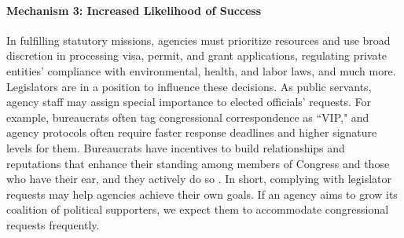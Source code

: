 \documentclass[12pt]{article}
\begin{document}
\paragraph{Mechanism 3: Increased Likelihood of Success} 

In fulfilling statutory missions, agencies must prioritize resources and use broad discretion in processing visa, permit, and grant applications, regulating private entities' compliance with environmental, health, and labor laws, and much more. 
Legislators are in a position to influence these decisions.
As public servants, agency staff may assign special importance to elected officials' requests. For example, bureaucrats often tag congressional correspondence as ``VIP," and agency protocols often require faster response deadlines and higher signature levels for them. %
Bureaucrats have incentives to build relationships and reputations that enhance their standing among members of Congress and those who have their ear, and they actively do so \citep{Carpenter2001}. In short, complying with legislator requests may help agencies achieve their own goals. If an agency aims to grow its coalition of political supporters, we expect them to accommodate congressional requests frequently.
\end{document}
